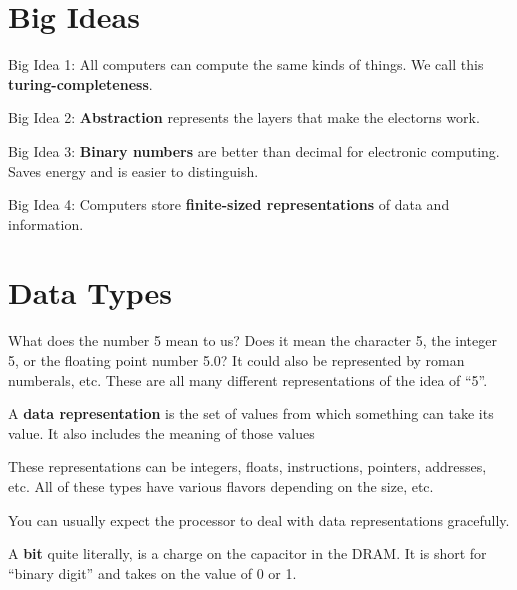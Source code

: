 
\section{Big Ideas}

\begin{definition}
	Big Idea 1: All computers can compute the same kinds of things. We call this \textbf{turing-completeness}.
\end{definition}

\begin{definition}
	Big Idea 2: \textbf{Abstraction} represents the layers that make the electorns work.
\end{definition}

\begin{definition}
	Big Idea 3: \textbf{Binary numbers} are better than decimal for electronic computing. Saves energy and is easier to distinguish.
\end{definition}

\begin{definition}
	Big Idea 4: Computers store \textbf{finite-sized representations} of data and information.
\end{definition}

\section{Data Types}

What does the number 5 mean to us? Does it mean the character 5, the integer 5, or the floating point number 5.0? It could also be represented by roman numberals, etc. These are all many different representations of the idea of ``5''.

\begin{definition}
	A \textbf{data representation} is the set of values from which something can take its value. It also includes the meaning of those values
\end{definition}

\begin{eg}
	These representations can be integers, floats, instructions, pointers, addresses, etc. All of these types have various flavors depending on the size, etc.
\end{eg}

You can usually expect the processor to deal with data representations gracefully.

\begin{definition}
	A \textbf{bit} quite literally, is a charge on the capacitor in the DRAM. It is short for ``binary digit'' and takes on the value of 0 or 1.
\end{definition}

